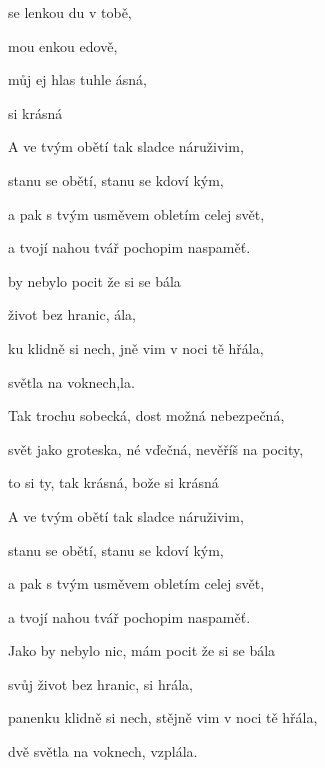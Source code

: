 

\zs
{} se lenkou du v tobě, 

 mou enkou edově, 

 můj ej hlas tuhle  ásná,   

 si krásná   
\ks

\zs
A ve tvým obětí tak sladce náruživim,

stanu se obětí, stanu se kdoví kým,

a pak s tvým usměvem obletím celej svět,

a tvojí nahou tvář pochopim naspaměť.
\ks

\zr
{} by nebylo   pocit že si se bála 

 život bez hranic, ála, 

ku klidně si nech, jně vim v noci tě hřála, 

 světla na voknech,la. 
\kr

\zs
Tak trochu sobecká, dost možná nebezpečná,

svět jako groteska, né vďečná, nevěříš na pocity,

to si ty, tak krásná, bože si krásná



A ve tvým obětí tak sladce náruživim,

stanu se obětí, stanu se kdoví kým,

a pak s tvým usměvem obletím celej svět,

a tvojí nahou tvář pochopim naspaměť.
\ks


\zr
Jako by nebylo nic, mám pocit že si se bála

svůj život bez hranic, si hrála,

panenku klidně si nech, stějně vim v noci tě hřála,

dvě světla na voknech, vzplála.
\kr
\kp





